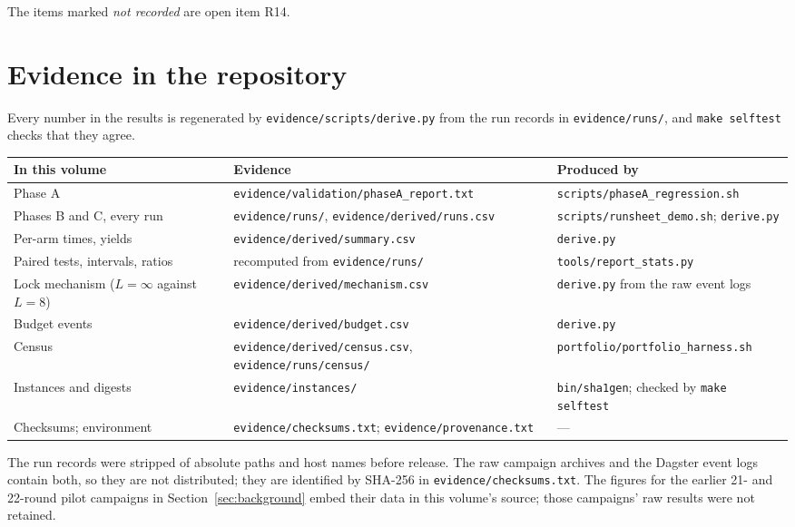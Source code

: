 \documentclass[11pt,a4paper]{article}
\begin{document}
The items marked \emph{not recorded} are open item R14.

\section{Evidence in the repository}\label{app:evidence}
Every number in the results is regenerated by \texttt{evidence/scripts/derive.py} from the run records
in \texttt{evidence/runs/}, and \texttt{make selftest} checks that they agree.

\begin{center}\footnotesize
\begin{tabularx}{\textwidth}{@{}>{\raggedright\arraybackslash}p{3.2cm}LL@{}}
\toprule
\textbf{In this volume} & \textbf{Evidence} & \textbf{Produced by}\\
\midrule
Phase A & \texttt{evidence/validation/phaseA\_report.txt} & \texttt{scripts/phaseA\_regression.sh}\\
Phases B and C, every run & \texttt{evidence/runs/}, \texttt{evidence/derived/runs.csv} & \texttt{scripts/runsheet\_demo.sh}; \texttt{derive.py}\\
Per-arm times, yields & \texttt{evidence/derived/summary.csv} & \texttt{derive.py}\\
Paired tests, intervals, ratios & recomputed from \texttt{evidence/runs/} & \texttt{tools/report\_stats.py}\\
Lock mechanism ($L=\infty$ against $L=8$) & \texttt{evidence/derived/mechanism.csv} & \texttt{derive.py} from the raw event logs\\
Budget events & \texttt{evidence/derived/budget.csv} & \texttt{derive.py}\\
Census & \texttt{evidence/derived/census.csv}, \texttt{evidence/runs/census/} & \texttt{portfolio/portfolio\_harness.sh}\\
Instances and digests & \texttt{evidence/instances/} & \texttt{bin/sha1gen}; checked by \texttt{make selftest}\\
Checksums; environment & \texttt{evidence/checksums.txt}; \texttt{evidence/provenance.txt} & ---\\
\bottomrule
\end{tabularx}
\end{center}

The run records were stripped of absolute paths and host names before release. The raw campaign
archives and the Dagster event logs contain both, so they are not distributed; they are identified by
SHA-256 in \texttt{evidence/checksums.txt}. The figures for the earlier 21- and 22-round pilot campaigns
in Section~\ref{sec:background} embed their data in this volume's source; those campaigns' raw results
were not retained.
\end{document}
